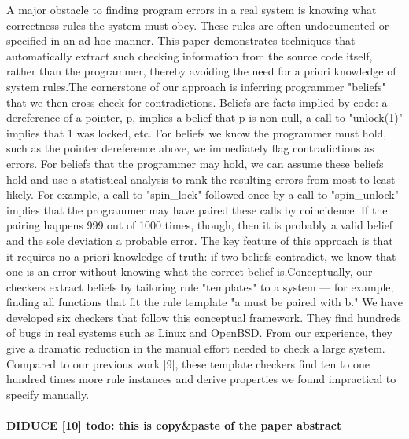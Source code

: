 A major obstacle to finding program errors in a real system is knowing what correctness rules the system must obey. These rules are often undocumented or specified in an ad hoc manner. This paper demonstrates techniques that automatically extract such checking information from the source code itself, rather than the programmer, thereby avoiding the need for a priori knowledge of system rules.The cornerstone of our approach is inferring programmer "beliefs" that we then cross-check for contradictions. Beliefs are facts implied by code: a dereference of a pointer, p, implies a belief that p is non-null, a call to "unlock(1)" implies that 1 was locked, etc. For beliefs we know the programmer must hold, such as the pointer dereference above, we immediately flag contradictions as errors. For beliefs that the programmer may hold, we can assume these beliefs hold and use a statistical analysis to rank the resulting errors from most to least likely. For example, a call to "spin\_lock" followed once by a call to "spin\_unlock" implies that the programmer may have paired these calls by coincidence. If the pairing happens 999 out of 1000 times, though, then it is probably a valid belief and the sole deviation a probable error. The key feature of this approach is that it requires no a priori knowledge of truth: if two beliefs contradict, we know that one is an error without knowing what the correct belief is.Conceptually, our checkers extract beliefs by tailoring rule "templates" to a system --- for example, finding all functions that fit the rule template "a must be paired with b." We have developed six checkers that follow this conceptual framework. They find hundreds of bugs in real systems such as Linux and OpenBSD. From our experience, they give a dramatic reduction in the manual effort needed to check a large system. Compared to our previous work [9], these template checkers find ten to one hundred times more rule instances and derive properties we found impractical to specify manually.
\\
\\
\textbf{DIDUCE [10] todo: this is copy\&paste of the paper abstract}
